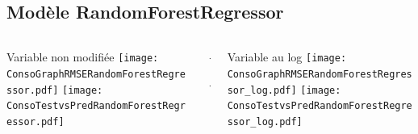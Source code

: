 \documentclass[8pt,aspectratio=169,hyperref={unicode=true}]{beamer}
\begin{document}
\subsection{Modèle RandomForestRegressor}
\begin{frame}{\insertsubsection}
  \begin{columns}[t]
    \begin{column}{.33\textwidth}
      \centering Variable non modifiée
      \texttt{[image: ConsoGraphRMSERandomForestRegressor.pdf]}
      \texttt{[image: ConsoTestvsPredRandomForestRegressor.pdf]}
    \end{column}
    \begin{column}{.33\textwidth}
      $\Longleftarrow$
      \scriptsize
      {\centering
        }
      

      \normalsize
      $\Longleftarrow$

      \raggedleft{$\Longrightarrow$}
      \scriptsize
      {\centering
        }
      

      \normalsize
      \raggedleft{$\Longrightarrow$}
    \end{column}
    \begin{column}{.33\textwidth}
      \centering Variable au log
      \texttt{[image: ConsoGraphRMSERandomForestRegressor\_log.pdf]}
      \texttt{[image: ConsoTestvsPredRandomForestRegressor\_log.pdf]}
    \end{column}
  \end{columns}
\end{frame}
\end{document}
